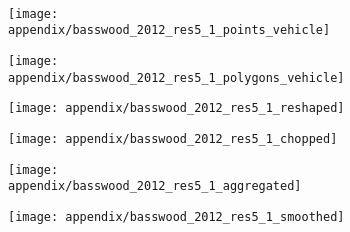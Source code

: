 
\appendixtitle 
\appendix

\unappendixtitle
\singleappendixtitle

\chapter{}

\begin{figure}\
  \begin{subfigure}[b]{0.49\textwidth}
    \centering
    \texttt{[image: appendix/basswood\_2012\_res5\_1\_points\_vehicle]}
   \end{subfigure}
  \begin{subfigure}[b]{0.49\textwidth}
    \centering
    \texttt{[image: appendix/basswood\_2012\_res5\_1\_polygons\_vehicle]}
  \end{subfigure}
  \begin{subfigure}[b]{0.49\textwidth}
    \centering
    \texttt{[image: appendix/basswood\_2012\_res5\_1\_reshaped]}
  \end{subfigure}
  \begin{subfigure}[b]{0.49\textwidth}
    \centering
    \texttt{[image: appendix/basswood\_2012\_res5\_1\_chopped]}
   \end{subfigure}
  \begin{subfigure}[b]{0.49\textwidth}
    \centering
    \texttt{[image: appendix/basswood\_2012\_res5\_1\_aggregated]}
   \end{subfigure}
  \begin{subfigure}[b]{0.49\textwidth}
    \centering
    \texttt{[image: appendix/basswood\_2012\_res5\_1\_smoothed]}
  \end{subfigure}
\end{figure}


